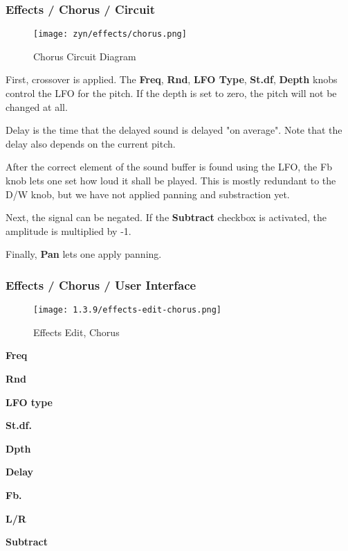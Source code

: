 \subsubsection{Effects / Chorus / Circuit}
\label{subsubsec:effects_edit_chorus_circuit}

\begin{figure}[H]
   \centering
   \texttt{[image: zyn/effects/chorus.png]}
   \caption{Chorus Circuit Diagram}
   \label{fig:chorus_circuit_diagram}
\end{figure}

   First, crossover is applied.
   The \textbf{Freq}, \textbf{Rnd}, \textbf{LFO Type}, \textbf{St.df},
   \textbf{Depth} knobs control the LFO
   for the pitch. If the depth is set to zero, the pitch will not be changed
   at all.

   Delay is the time that the delayed sound is delayed "on average". Note
   that the delay also depends on the current pitch.

   After the correct element of the sound buffer is found using the LFO, the
   Fb knob lets one set how loud it shall be played. This is mostly redundant
   to the D/W knob, but we have not applied panning and substraction yet.

   Next, the signal can be negated. If the \textbf{Subtract}
   checkbox is activated, the amplitude is multiplied by -1.

   Finally, \textbf{Pan} lets one apply panning.

\subsubsection{Effects / Chorus / User Interface}
\label{subsubsec:effects_edit_chorus_ui}

\begin{figure}[H]
   \centering
   \texttt{[image: 1.3.9/effects-edit-chorus.png]}
   \caption{Effects Edit, Chorus}
   \label{fig:effects_edit_chorus}
\end{figure}

   \begin{enumber}
      \item \textbf{Freq}
      \item \textbf{Rnd}
      \item \textbf{LFO type}
      \item \textbf{St.df.}
      \item \textbf{Dpth}
      \item \textbf{Delay}
      \item \textbf{Fb.}
      \item \textbf{L/R}
      \item \textbf{Subtract}
   \end{enumber}

